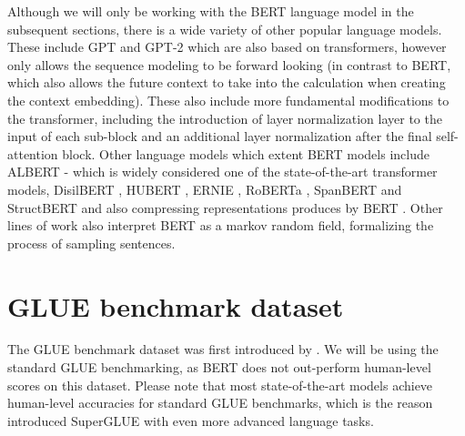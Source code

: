 \documentclass[a4paper,12pt,twoside,openright]{report}
\begin{document}
Although we will only be working with the BERT language model in the subsequent sections, there is a wide variety of other popular language models.
These include GPT \cite{radford18} and GPT-2 \cite{radford19} which are also based on transformers, however only allows the sequence modeling to be forward looking (in contrast to BERT, which also allows the future context to take into the calculation when creating the context embedding).
These also include more fundamental modifications to the transformer, including the introduction of layer normalization \cite{ba16} layer to the input of each sub-block and an additional layer normalization after the final self-attention block. 
Other language models which extent BERT models include ALBERT \cite{lan20} - which is widely considered one of the state-of-the-art transformer models, DisilBERT \cite{sanh19}, HUBERT \cite{moradshahi19}, ERNIE \cite{sun19}, RoBERTa \cite{liu19}, SpanBERT \cite{joshi19} and StructBERT \cite{wang19d} and also compressing representations produces by BERT \cite{shen19}.
Other lines of work \cite{wang19e} also interpret BERT as a markov random field, formalizing the process of sampling sentences.

\section{GLUE benchmark dataset}

The GLUE benchmark dataset was first introduced by \cite{wang19}.
We will be using the standard GLUE benchmarking, as BERT does not out-perform human-level scores on this dataset.
Please note that most state-of-the-art models achieve human-level accuracies for standard GLUE benchmarks, which is the reason \cite{wang19b} introduced SuperGLUE with even more advanced language tasks.
\end{document}
